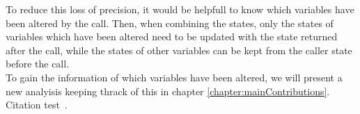 To reduce this loss of precision, it would be helpfull to know which variables have been altered by the call. Then, when combining the states, only the states of variables which have been altered need to be updated with the state returned after the call, while the states of other variables can be kept from the caller state before the call.\\
To gain the information of which variables have been altered, we will present a new analyisis keeping thrack of this in chapter \ref{chapter:mainContributions}.
  Citation test~\parencite{latex}.